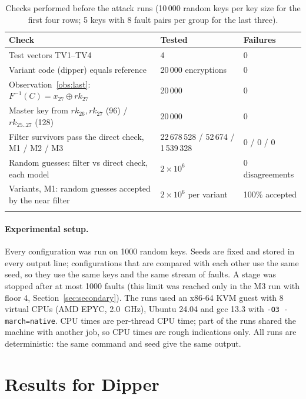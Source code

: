 \documentclass[pdflatex,sn-mathphys-num]{sn-jnl}
\theoremstyle{thmstyleone}%
\theoremstyle{thmstylethree}%
\newcommand{\rk}{\mathit{rk}}
\newcommand{\Finv}{F^{-1}}
\begin{document}
\begin{table}[t]
\caption{Checks performed before the attack runs (10\,000 random keys per key size for the first four
rows; 5 keys with 8 fault pairs per group for the last three).}\label{tab:checks}
\begin{tabular}{@{}lll@{}}
\toprule
Check & Tested & Failures\\
\midrule
Test vectors TV1--TV4 & 4 & 0\\
Variant code (dipper) equals reference & 20\,000 encryptions & 0\\
Observation~\ref{obs:last}: $\Finv(C) = x_{27}\oplus\rk_{27}$ & 20\,000 & 0\\
Master key from $\rk_{26},\rk_{27}$ (96) / $\rk_{25..27}$ (128) & 20\,000 & 0\\
Filter survivors pass the direct check, M1 / M2 / M3 & 22\,678\,528 / 52\,674 / 1\,539\,328 & 0 / 0 / 0\\
Random guesses: filter vs direct check, each model & $2\times 10^{6}$ & 0 disagreements\\
Variants, M1: random guesses accepted by the near filter & $2\times10^{6}$ per variant & 100\% accepted\\
\botrule
\end{tabular}
\end{table}

\paragraph{Experimental setup.} Every configuration was run on 1000 random keys. Seeds are fixed and
stored in every output line; configurations that are compared with each other use the same seed, so they
use the same keys and the same stream of faults. A stage was stopped after at most 1000 faults (this limit
was reached only in the M3 run with floor 4, Section~\ref{sec:secondary}). The runs used an x86-64 KVM
guest with 8 virtual CPUs (AMD EPYC, 2.0~GHz), Ubuntu 24.04 and gcc 13.3 with
\texttt{-O3 -march=native}. CPU times are per-thread CPU time; part of the runs shared the machine with
another job, so CPU times are rough indications only. All runs are deterministic: the same command and
seed give the same output.

\section{Results for Dipper}\label{sec:results}
\end{document}
